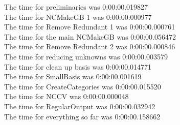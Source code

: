 \documentclass[rep10,leqno]{report}
\begin{document}
\noindent
The time for preliminaries was 0:00:00.019827\\
The time for NCMakeGB 1 was 0:00:00.000977\\
The time for Remove Redundant 1 was 0:00:00.000761\\
The time for the main NCMakeGB was 0:00:00.056472\\
The time for Remove Redundant 2 was 0:00:00.000846\\
The time for reducing unknowns was 0:00:00.003579\\
The time for clean up basis was 0:00:00.014771\\
The time for SmallBasis was 0:00:00.001619\\
The time for CreateCategories was 0:00:00.015520\\
The time for NCCV was 0:00:00.000048\\
The time for RegularOutput was 0:00:00.032942\\
The time for everything so far was 0:00:00.158662\\
\end{document}
